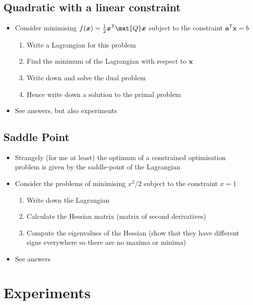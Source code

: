\documentclass[11pt]{article}
\newcommand{\tr}{\textsf{T}}
\begin{document}
\subsection{Quadratic with a linear constraint}
\label{sec:orgaea0859}
\begin{itemize}
\item Consider minimising \(f(\bm{x}) = \tfrac{1}{2} \bm{x}^\tr \mat{Q} \bm{x}\)
subject to the constraint \(\bm{a}^\tr\bm{x} = b\)
\begin{enumerate}
\item Write a Lagrangian for this problem
\item Find the minimum of the Lagrangian with respect to \(\bm{x}\)
\item Write down and solve the dual problem
\item Hence write down a solution to the primal problem
\end{enumerate}
\item See answers, but also experiments
\end{itemize}

\subsection{Saddle Point}
\label{sec:org81f28a0}
\begin{itemize}
\item Strangely (for me at least) the optimum of a constrained
optimisation problem is given by the saddle-point of the Lagrangian
\item Consider the problems of minimising \(x^2/2\) subject to the
constraint \(x=1\)
\begin{enumerate}
\item Write down the Lagrangian
\item Calculate the Hessian matrix (matrix of second derivatives)
\item Compute the eigenvalues of the Hessian (show that they have
different signs everywhere so there are  no maxima or minima)
\end{enumerate}
\item See answers
\end{itemize}

\section{Experiments}
\label{sec:orgeffb909}
\end{document}

